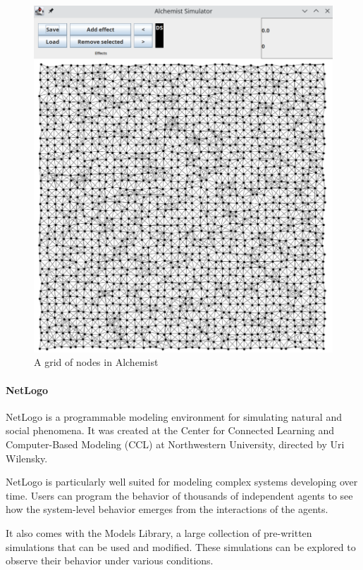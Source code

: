 \documentclass[12pt,a4paper,openright,twoside]{book}
\begin{document}
\begin{figure}[h]
  \centering
  \includegraphics[width=\textwidth]{figures/alchemist.png}
  \caption{A grid of nodes in Alchemist}
\end{figure}

\paragraph*{NetLogo}

NetLogo is a programmable modeling environment for simulating natural and social phenomena. It was created at the Center
for Connected Learning and Computer-Based Modeling (CCL) at Northwestern University, directed by Uri Wilensky.

NetLogo is particularly well suited for modeling complex systems developing over time.
Users can program the behavior of thousands of independent agents to see how the system-level behavior emerges from the interactions of the agents.

It also comes with the Models Library, a large collection of pre-written simulations that can be used and modified.
These simulations can be explored to observe their behavior under various conditions.
\end{document}
